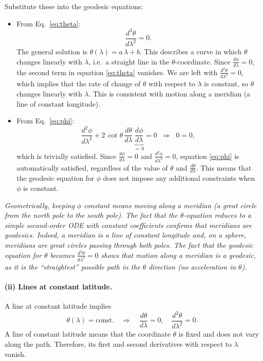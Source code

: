 Substitute these into the geodesic equations:
\begin{itemize}
\item From Eq.~\eqref{eq:theta}:
\[
\frac{d^2 \theta}{d\lambda^2} = 0.
\]
The general solution is \(\theta(\lambda) = a\,\lambda + b\). This describes a curve in which \(\theta\) changes linearly with \(\lambda\), i.e.\ a straight line in the \(\theta\)-coordinate. Since \(\tfrac{d\phi}{d\lambda} = 0\), the second term in equation \eqref{eq:theta} vanishes. We are left with \(\tfrac{d^2 \theta}{d\lambda^2} = 0\), which implies that the rate of change of \(\theta\) with respect to \(\lambda\) is constant, so \(\theta\) changes linearly with \(\lambda\). This is consistent with motion along a meridian (a line of constant longitude).

\item From Eq.~\eqref{eq:phi}:
\[
\frac{d^2 \phi}{d\lambda^2}
+ 2 \,\cot\theta\,\frac{d\theta}{d\lambda}\,\underbrace{\frac{d\phi}{d\lambda}}_{=\,0}
= 0
\;\;\Longrightarrow\;\;
0 = 0,
\]
which is trivially satisfied. Since \(\tfrac{d\phi}{d\lambda} = 0\) and \(\tfrac{d^2\phi}{d\lambda^2} = 0\), equation \eqref{eq:phi} is automatically satisfied, regardless of the value of \(\theta\) and \(\tfrac{d\theta}{d\lambda}\). This means that the geodesic equation for \(\phi\) does not impose any additional constraints when \(\phi\) is constant.
\end{itemize}

\emph{Geometrically, keeping \(\phi\) constant means moving along a meridian (a great circle from the north pole to the south pole). The fact that the \(\theta\)-equation reduces to a simple second-order ODE with constant coefficients confirms that meridians are geodesics. Indeed, a meridian is a line of constant longitude and, on a sphere, meridians are great circles passing through both poles. The fact that the geodesic equation for \(\theta\) becomes \(\tfrac{d^2 \theta}{d\lambda^2} = 0\) shows that motion along a meridian is a geodesic, as it is the ``straightest'' possible path in the \(\theta\) direction (no acceleration in \(\theta\)).}

\paragraph{(ii) Lines at constant latitude.}
A line at constant latitude implies
\[
\theta(\lambda) = \text{const.}
\quad\Longrightarrow\quad
\frac{d\theta}{d\lambda} = 0, \quad
\frac{d^2\theta}{d\lambda^2} = 0.
\]
A line of constant latitude means that the coordinate \(\theta\) is fixed and does not vary along the path. Therefore, its first and second derivatives with respect to \(\lambda\) vanish.

